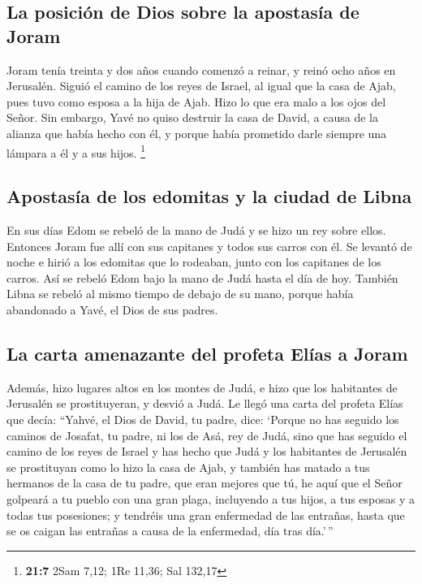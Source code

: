 \begin{paracol}{2}
{\subsection{La posición de Dios sobre la apostasía de
Joram}\label{la-posiciuxf3n-de-dios-sobre-la-apostasuxeda-de-joram}}

 Joram tenía treinta y dos años cuando comenzó a reinar, y
reinó ocho años en Jerusalén.  Siguió el camino de los
reyes de Israel, al igual que la casa de Ajab, pues tuvo como esposa a
la hija de Ajab. Hizo lo que era malo a los ojos del Señor.
 Sin embargo, Yavé no quiso destruir la casa de David, a
causa de la alianza que había hecho con él, y porque había prometido
darle siempre una lámpara a él y a sus hijos. \footnote{\textbf{21:7}
  2Sam 7,12; 1Re 11,36; Sal 132,17}

\hypertarget{apostasuxeda-de-los-edomitas-y-la-ciudad-de-libna}{%
\subsection{Apostasía de los edomitas y la ciudad de
Libna}\label{apostasuxeda-de-los-edomitas-y-la-ciudad-de-libna}}

 En sus días Edom se rebeló de la mano de Judá y se hizo
un rey sobre ellos.  Entonces Joram fue allí con sus
capitanes y todos sus carros con él. Se levantó de noche e hirió a los
edomitas que lo rodeaban, junto con los capitanes de los carros.
 Así se rebeló Edom bajo la mano de Judá hasta el día de
hoy. También Libna se rebeló al mismo tiempo de debajo de su mano,
porque había abandonado a Yavé, el Dios de sus padres.

\hypertarget{la-carta-amenazante-del-profeta-eluxedas-a-joram}{%
\subsection{La carta amenazante del profeta Elías a
Joram}\label{la-carta-amenazante-del-profeta-eluxedas-a-joram}}

 Además, hizo lugares altos en los montes de Judá, e hizo
que los habitantes de Jerusalén se prostituyeran, y desvió a Judá.
 Le llegó una carta del profeta Elías que decía: ``Yahvé,
el Dios de David, tu padre, dice: `Porque no has seguido los caminos de
Josafat, tu padre, ni los de Asá, rey de Judá,  sino que
has seguido el camino de los reyes de Israel y has hecho que Judá y los
habitantes de Jerusalén se prostituyan como lo hizo la casa de Ajab, y
también has matado a tus hermanos de la casa de tu padre, que eran
mejores que tú,  he aquí que el Señor golpeará a tu
pueblo con una gran plaga, incluyendo a tus hijos, a tus esposas y a
todas tus posesiones;  y tendréis una gran enfermedad de
las entrañas, hasta que se os caigan las entrañas a causa de la
enfermedad, día tras día.'\,''


\end{paracol}
